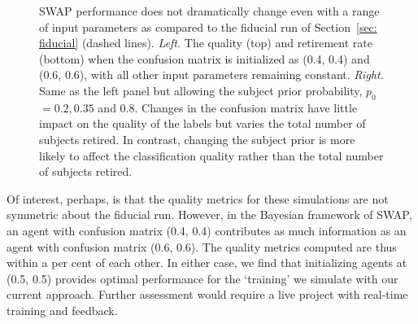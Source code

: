 \documentclass[twocolumn]{aastex6}
\newcommand{\p}{$p_0$}
\begin{document}
\begin{figure}[t]
\caption{SWAP performance does not dramatically change even with a range of input parameters as compared to the fiducial run of Section~\ref{sec: fiducial} (dashed lines).  \textit{Left.} The quality (top) and retirement rate (bottom) when the confusion matrix is initialized as (0.4, 0.4) and (0.6, 0.6), with all other input parameters remaining constant. \textit{Right.} Same as the left panel but allowing the subject prior probability, \p $= 0.2, 0.35$ and $0.8$. Changes in the confusion matrix have little impact on the quality of the labels but varies the total number of subjects retired. In contrast, changing the subject prior is more likely to affect the classification quality rather than the total number of subjects retired. \label{fig: tweak swap}}
\end{figure}

Of interest, perhaps, is that the quality metrics for these simulations are not symmetric 
about the fiducial run. However, in the Bayesian framework of SWAP, an agent with 
confusion matrix (0.4, 0.4) contributes as much information as an agent with confusion matrix (0.6, 0.6).
The quality metrics computed are thus within a per cent of each other.
In either case, we find that initializing agents at (0.5, 0.5) provides optimal performance 
for the `training' we simulate with our current approach. Further assessment would 
require a live project with real-time training and feedback. 
\end{document}
